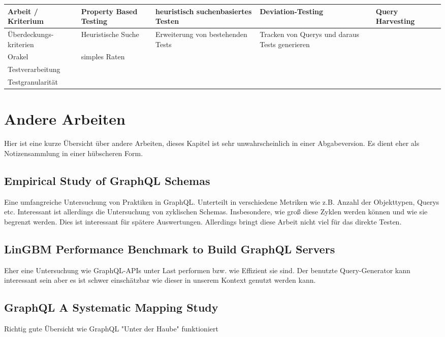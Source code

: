 \begin{center}
    \begin{table}[!ht]
        \begin{tabularx}{\textwidth}{|C|C|C|C|C|C|}
            \hline
            \textbf{ Arbeit / Kriterium} & \textbf{Property Based Testing} & \textbf{heuristisch suchenbasiertes Testen} & \textbf{Deviation-Testing} & \textbf{Query Harvesting} \\
            \hline
            Überdeckungs- kriterien & Heuristische Suche & Erweiterung von bestehenden Tests & Tracken von Querys und daraus Tests generieren & \\
            \hline
            Orakel & simples Raten &  & &\\
            \hline
            Testverarbeitung & & & &\\
            \hline
            Testgranularität & & & &\\
            \hline
        \end{tabularx}
    \end{table}
\end{center}

\section{Andere Arbeiten}
Hier ist eine kurze Übersicht über andere Arbeiten, dieses Kapitel ist sehr unwahrscheinlich in einer Abgabeversion.
Es dient eher als Notizensammlung in einer hübscheren Form.

\subsection{Empirical Study of GraphQL Schemas}
Eine umfangreiche Untersuchung von Praktiken in GraphQL. Unterteilt in verschiedene Metriken wie z.B.
Anzahl der Objekttypen, Querys etc.
Interessant ist allerdings die Untersuchung von zyklischen Schemas. Insbesondere, wie groß diese Zyklen
werden können und wie sie begrenzt werden. Dies ist interessant für spätere Auswertungen. Allerdings bringt
diese Arbeit nicht viel für das direkte Testen.

\subsection{LinGBM Performance Benchmark to Build GraphQL Servers}
Eher eine Untersuchung wie GraphQL-APIs unter Last performen bzw. wie Effizient sie sind.
Der benutzte Query-Generator kann interessant sein aber es ist schwer einschätzbar wie dieser in unserem Kontext genutzt werden
kann.

\subsection{GraphQL A Systematic Mapping Study}
Richtig gute Übersicht wie GraphQL "Unter der Haube" funktioniert


